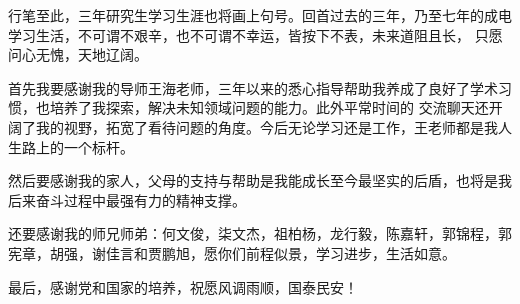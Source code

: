 \thesisacknowledgement

行笔至此，三年研究生学习生涯也将画上句号。回首过去的三年，乃至七年的成电学习生活，不可谓不艰辛，也不可谓不幸运，皆按下不表，未来道阻且长，
只愿问心无愧，天地辽阔。

首先我要感谢我的导师王海老师，三年以来的悉心指导帮助我养成了良好了学术习惯，也培养了我探索，解决未知领域问题的能力。此外平常时间的
交流聊天还开阔了我的视野，拓宽了看待问题的角度。今后无论学习还是工作，王老师都是我人生路上的一个标杆。

然后要感谢我的家人，父母的支持与帮助是我能成长至今最坚实的后盾，也将是我后来奋斗过程中最强有力的精神支撑。

还要感谢我的师兄师弟：何文俊，柒文杰，祖柏杨，龙行毅，陈嘉轩，郭锦程，郭宪章，胡强，谢佳言和贾鹏旭，愿你们前程似景，学习进步，生活如意。

最后，感谢党和国家的培养，祝愿风调雨顺，国泰民安！
